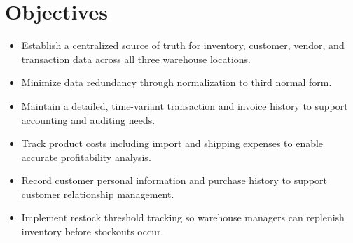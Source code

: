 \section{Objectives}

\begin{itemize}
  \item Establish a centralized source of truth for inventory, customer, vendor, and transaction data
    across all three warehouse locations.
  \item Minimize data redundancy through normalization to third normal form.
  \item Maintain a detailed, time-variant transaction and invoice history to support accounting and
    auditing needs.
  \item Track product costs including import and shipping expenses to enable accurate profitability
    analysis.
  \item Record customer personal information and purchase history to support customer relationship
    management.
  \item Implement restock threshold tracking so warehouse managers can replenish inventory before
    stockouts occur.
\end{itemize}
